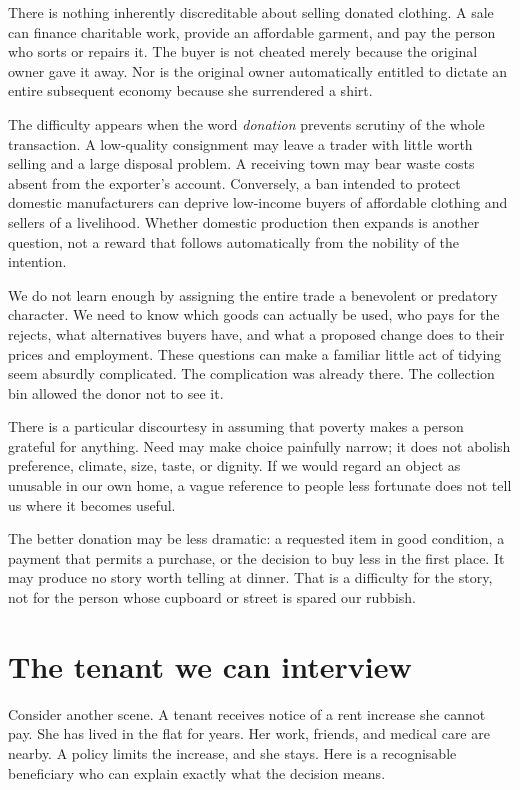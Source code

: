 \documentclass[12pt,a4paper]{book}
\begin{document}
There is nothing inherently discreditable about selling donated clothing. A sale can finance charitable work, provide an affordable garment, and pay the person who sorts or repairs it. The buyer is not cheated merely because the original owner gave it away. Nor is the original owner automatically entitled to dictate an entire subsequent economy because she surrendered a shirt.

The difficulty appears when the word \emph{donation} prevents scrutiny of the whole transaction. A low-quality consignment may leave a trader with little worth selling and a large disposal problem. A receiving town may bear waste costs absent from the exporter's account. Conversely, a ban intended to protect domestic manufacturers can deprive low-income buyers of affordable clothing and sellers of a livelihood. Whether domestic production then expands is another question, not a reward that follows automatically from the nobility of the intention.

We do not learn enough by assigning the entire trade a benevolent or predatory character. We need to know which goods can actually be used, who pays for the rejects, what alternatives buyers have, and what a proposed change does to their prices and employment. These questions can make a familiar little act of tidying seem absurdly complicated. The complication was already there. The collection bin allowed the donor not to see it.

There is a particular discourtesy in assuming that poverty makes a person grateful for anything. Need may make choice painfully narrow; it does not abolish preference, climate, size, taste, or dignity. If we would regard an object as unusable in our own home, a vague reference to people less fortunate does not tell us where it becomes useful.

The better donation may be less dramatic: a requested item in good condition, a payment that permits a purchase, or the decision to buy less in the first place. It may produce no story worth telling at dinner. That is a difficulty for the story, not for the person whose cupboard or street is spared our rubbish.

\section*{The tenant we can interview}

Consider another scene. A tenant receives notice of a rent increase she cannot pay. She has lived in the flat for years. Her work, friends, and medical care are nearby. A policy limits the increase, and she stays. Here is a recognisable beneficiary who can explain exactly what the decision means.
\end{document}
